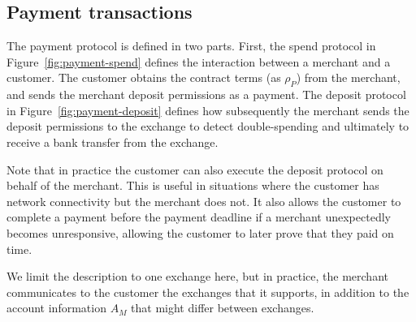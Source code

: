 \subsection{Payment transactions}
The payment protocol is defined in two parts.  First, the spend protocol in
Figure~\ref{fig:payment-spend} defines the interaction between a merchant and
a customer.  The customer obtains the contract terms (as $\rho_P$) from the
merchant, and sends the merchant deposit permissions as a payment.  The deposit protocol
in Figure~\ref{fig:payment-deposit} defines how subsequently the merchant sends the
deposit permissions to the exchange to detect double-spending and ultimately
to receive a bank transfer from the exchange.

Note that in practice the customer can also execute the deposit
protocol on behalf of the merchant. This is useful in situations where
the customer has network connectivity but the merchant does not. It
also allows the customer to complete a payment before the payment
deadline if a merchant unexpectedly becomes unresponsive, allowing the
customer to later prove that they paid on time.

We limit the description to one exchange here, but in practice, the merchant
communicates to the customer the exchanges that it supports, in addition to the
account information $A_M$ that might differ between exchanges.

